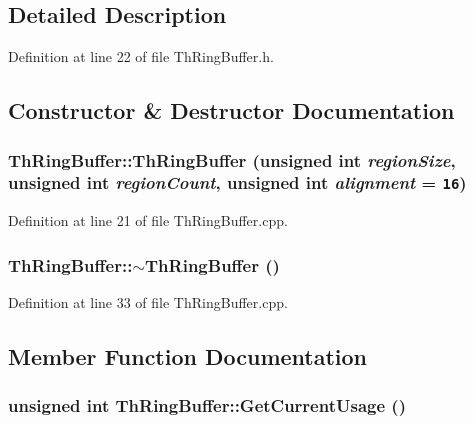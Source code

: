 \subsection{Detailed Description}


Definition at line 22 of file ThRingBuffer.h.

\subsection{Constructor \& Destructor Documentation}
\hypertarget{class_th_ring_buffer_0405ced6ef8ae7a75afd6f67688e47f3}{
\subsubsection[{ThRingBuffer}]{\setlength{\rightskip}{0pt plus 5cm}ThRingBuffer::ThRingBuffer (unsigned int {\em regionSize}, \/  unsigned int {\em regionCount}, \/  unsigned int {\em alignment} = {\tt 16})}}
\label{class_th_ring_buffer_0405ced6ef8ae7a75afd6f67688e47f3}




Definition at line 21 of file ThRingBuffer.cpp.\hypertarget{class_th_ring_buffer_7a37bd1afc7b71c502cbea7e1b5004f3}{
\subsubsection[{$\sim$ThRingBuffer}]{\setlength{\rightskip}{0pt plus 5cm}ThRingBuffer::$\sim$ThRingBuffer ()}}
\label{class_th_ring_buffer_7a37bd1afc7b71c502cbea7e1b5004f3}




Definition at line 33 of file ThRingBuffer.cpp.

\subsection{Member Function Documentation}
\hypertarget{class_th_ring_buffer_d2e1aa38203a30491e3eb2ec7eafcc4c}{
\subsubsection[{GetCurrentUsage}]{\setlength{\rightskip}{0pt plus 5cm}unsigned int ThRingBuffer::GetCurrentUsage ()}}
\label{class_th_ring_buffer_d2e1aa38203a30491e3eb2ec7eafcc4c}




